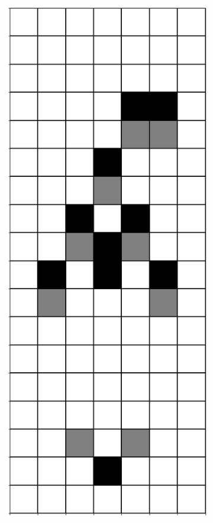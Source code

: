 \documentclass[12pt]{article}
\numberwithin{figure}{section} %
\begin{document}
\begin{figure}[H]
\begin{subfigure}{0.18\textwidth}
     		\subcaption{}
   	\end{subfigure}
        \begin{subfigure}{0.18\textwidth}
     		\centering
     		\includegraphics[width=\linewidth]{Section4/18.2}

\end{subfigure}
\end{figure}
\end{document}
